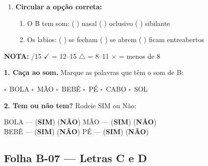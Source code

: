 \begin{exercicio}
\begin{enumerate}[resume]
  \item \textbf{Circular a opção correta:}
  \begin{enumerate}[label=(\alph*)]
    \item O B tem som: ( ) nasal ( ) oclusivo ( ) sibilante
    \item Os labios: ( ) se fecham ( ) se abrem ( ) ficam entreabertos
  \end{enumerate}
\end{enumerate}

\noindent\textbf{NOTA:} \underline{\hspace{1cm}}/15 \quad $\checkmark$ = 12--15 \quad $\triangle$ = 8--11 \quad $\times$ = menos de 8
\end{exercicio}

\begin{somletra}[title={\faMusic~Atividade de Som da Letra --- B\^onus (n\~ao vale nota)}]
\textbf{1. Ca\c{c}a ao som.} Marque as palavras que t\^e{}m o som de B:
\begin{center}
$\square$~BOLA \quad $\square$~M\~AO \quad $\square$~BEB\^E \quad $\square$~P\'E \quad $\square$~CABO \quad $\square$~SOL
\end{center}

\textbf{2. Tem ou n\~ao{} tem?} Rodeie SIM ou N\~ao:
\begin{center}
BOLA --- (\textbf{SIM}) (\textbf{N\~AO}) \quad M\~AO --- (\textbf{SIM}) (\textbf{N\~AO}) \\ BEB\^E --- (\textbf{SIM}) (\textbf{N\~AO}) \quad P\'E --- (\textbf{SIM}) (\textbf{N\~AO})
\end{center}
\end{somletra}



\subsection{Folha B-07 --- Letras C e D}

